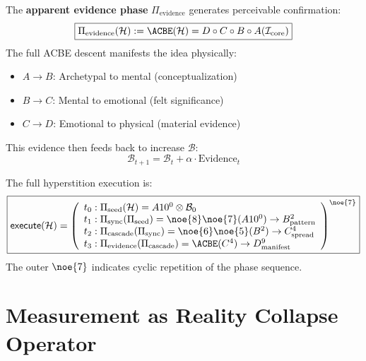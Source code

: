 \begin{definition}
\label{def:evidence-phase}
The \textbf{apparent evidence phase} $\Pi_{\text{evidence}}$ generates perceivable confirmation:
\begin{equation}
\boxed{
\Pi_{\text{evidence}}(\mathcal{H}) := \ACBE(\mathcal{H}) = D \circ C \circ B \circ A(\mathcal{I}_{\text{core}})
}
\end{equation}
The full ACBE descent manifests the idea physically:
\begin{itemize}
    \item $A \to B$: Archetypal to mental (conceptualization)
    \item $B \to C$: Mental to emotional (felt significance)
    \item $C \to D$: Emotional to physical (material evidence)
\end{itemize}
This evidence then feeds back to increase $\mathcal{B}$:
\[
\mathcal{B}_{t+1} = \mathcal{B}_t + \alpha \cdot \text{Evidence}_t
\]
\end{definition}

\begin{definition}
\label{def:complete-execution}
The full hyperstition execution is:
\begin{equation}
\boxed{
\mathsf{execute}(\mathcal{H}) = \left(
\begin{array}{l}
    t_0: \Pi_{\text{seed}}(\mathcal{H}) = A10^0 \otimes \mathcal{B}_0 \\
    t_1: \Pi_{\text{sync}}(\Pi_{\text{seed}}) = \noe{8}\noe{7}(A10^0) \to B^2_{\text{pattern}} \\
    t_2: \Pi_{\text{cascade}}(\Pi_{\text{sync}}) = \noe{6}\noe{5}(B^2) \to C^4_{\text{spread}} \\
    t_3: \Pi_{\text{evidence}}(\Pi_{\text{cascade}}) = \ACBE(C^4) \to D^9_{\text{manifest}}
\end{array}
\right)^{\noe{7}}
}
\end{equation}
The outer $\noe{7}$ indicates cyclic repetition of the phase sequence.
\end{definition}

\section{Measurement as Reality Collapse Operator}
\label{sec:measure-operator}

